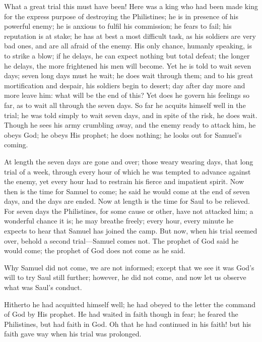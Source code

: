 What a great trial this must have been! Here was a king who had
been made king for the express purpose of destroying the Philistines;
he is in presence of his powerful enemy; he is anxious to fulfil his
commission; he fears to fail; his reputation is at stake; he has at
best a most difficult task, as his soldiers are very bad ones, and are
all afraid of the enemy. His only chance, humanly speaking, is to
strike a blow; if he delays, he can expect nothing but total defeat;
the longer he delays, the more frightened his men will become. Yet he
is told to wait seven days; seven long days must he wait; he does wait
through them; and to his great mortification and despair, his soldiers
begin to desert; day after day more and more leave him: what will be
the end of this? Yet does he govern his feelings so far, as to wait
all through the seven days. So far he acquits himself well in the
trial; he was told simply to wait seven days, and in spite of the
risk, he does wait. Though he sees his army crumbling away, and the
enemy ready to attack him, he obeys God; he obeys His prophet; he does
nothing; he looks out for Samuel's coming.

At length the seven days are gone and over; those weary wearing
days, that long trial of a week, through every hour of which he was
tempted to advance against the enemy, yet every hour had to restrain
his fierce and impatient spirit. Now then is the time for Samuel to
come; he said he would come at the end of seven days, and the days are
ended. Now at length is the time for Saul to be relieved. For seven
days the Philistines, for some cause or other, have not attacked him;
a wonderful chance it is; he may breathe freely; every hour, every
minute he expects to hear that Samuel has joined the camp. But now,
when his trial seemed over, behold a second trial—Samuel comes not.
The prophet of God said he would come; the prophet of God does not
come as he said.

Why Samuel did not come, we are not informed; except that we see it
was God's will to try Saul still further; however, he did not come,
and now let us observe what was Saul's conduct.

Hitherto he had acquitted himself well; he had obeyed to the letter
the command of God by His prophet. He had waited in faith though in
fear; he feared the Philistines, but had faith in God. Oh that he had
continued in his faith! but his faith gave way when his trial was
prolonged.

